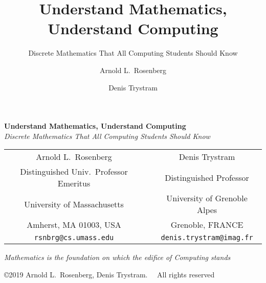 \documentclass[envcountchap]{svmono}
\begin{document}



\author{Arnold L.~Rosenberg \and Denis Trystram}
\title{Understand Mathematics, Understand Computing}
\subtitle{Discrete Mathematics That All Computing Students Should Know}

\maketitle

\begin{center}
{\Large\bf Understand Mathematics, Understand Computing} \\
{\large\it Discrete Mathematics That All Computing Students Should Know}
\end{center}


\begin{center}
\begin{tabular}{ccc}
{\large Arnold L.~Rosenberg} & & {\large Denis Trystram} \\
Distinguished Univ.~Professor Emeritus
  & & Distinguished Professor \\
University of Massachusetts  & & University of Grenoble Alpes \\
Amherst, MA 01003, USA       & & Grenoble, FRANCE \\
{\small\tt rsnbrg@cs.umass.edu} & & {\small\tt denis.trystram@imag.fr}
\end{tabular}
\end{center}

\vspace*{.25in}

{\it Mathematics is the foundation on which the edifice of Computing stands}

\begin{figure}[h]
\centerline{}
\end{figure}


\begin{center}
{\small \copyright 2019 Arnold L.~Rosenberg, Denis Trystram}. \ \
{\small All rights reserved}
\end{center}


\frontmatter




\tableofcontents


\end{document}
